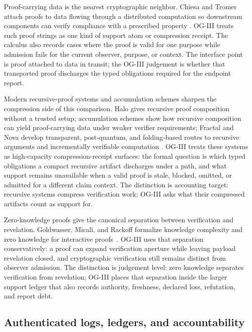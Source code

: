 \documentclass[11pt,twoside]{article}
\theoremstyle{definition}
\begin{document}
Proof-carrying data is the nearest cryptographic neighbor. Chiesa and Tromer
attach proofs to data flowing through a distributed computation so downstream
components can verify compliance with a prescribed property
\cite{chiesa_tromer_pcd_2010}. OG-III treats such proof strings as one kind of
support atom or compression receipt. The calculus also records cases where the
proof is valid for one purpose while admission fails for the current observer,
purpose, or context. The interface point is proof attached to data in transit;
the OG-III judgement is whether that transported proof discharges the typed
obligations required for the endpoint report.

Modern recursive-proof systems and accumulation schemes sharpen the compression
side of this comparison. Halo gives recursive proof composition without a
trusted setup; accumulation schemes show how recursive composition can yield
proof-carrying data under weaker verifier requirements; Fractal and Nova develop
transparent, post-quantum, and folding-based routes to recursive arguments and
incrementally verifiable computation
\cite{bowe_halo_2019,bunz_recursive_accumulation_2020,chiesa_fractal_2019,kothapalli_nova_2021}.
OG-III treats these systems as high-capacity compression-receipt surfaces: the
formal question is which typed obligations a compact recursive artifact
discharges under a path, and what support remains unavailable when a valid proof
is stale, blocked, omitted, or admitted for a different claim context. The
distinction is accounting target: recursive systems compress verification work;
OG-III asks what their compressed artifacts count as support for.

Zero-knowledge proofs give the canonical separation between verification and
revelation. Goldwasser, Micali, and Rackoff formalize knowledge complexity and
zero knowledge for interactive proofs~\cite{goldwasser_knowledge_complexity_1989}.
OG-III uses that separation conservatively: a proof can expand verification
aperture while leaving payload revelation closed, and cryptographic verification
still remains distinct from observer admission. The distinction is judgement
level: zero knowledge separates verification from revelation; OG-III places
that separation inside the larger support ledger that also records authority,
freshness, declared loss, refutation, and report debt.

\subsection{Authenticated logs, ledgers, and accountability}
\end{document}
